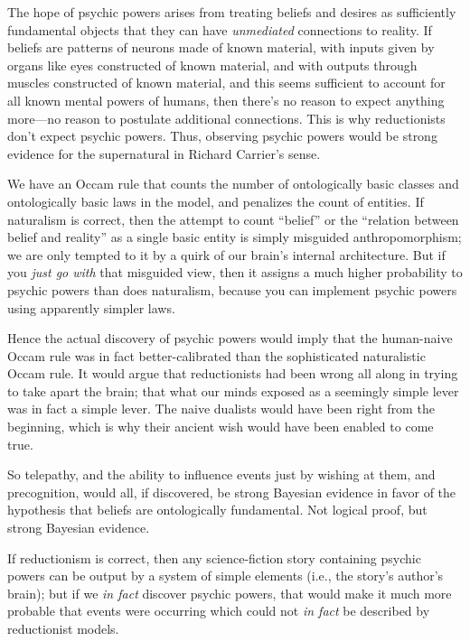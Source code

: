 {
 The hope of psychic powers arises from treating beliefs and
desires as sufficiently fundamental objects that they can have
\textit{unmediated} connections to reality. If beliefs are patterns of
neurons made of known material, with inputs given by organs like eyes
constructed of known material, and with outputs through muscles
constructed of known material, and this seems sufficient to account for
all known mental powers of humans, then there's no
reason to expect anything more---no reason to postulate additional
connections. This is why reductionists don't expect
psychic powers. Thus, observing psychic powers would be strong evidence
for the supernatural in Richard Carrier's sense.}

{
 We have an Occam rule that counts the number of ontologically
basic classes and ontologically basic laws in the model, and penalizes
the count of entities. If naturalism is correct, then the attempt to
count ``belief'' or the
``relation between belief and
reality'' as a single basic entity is simply
misguided anthropomorphism; we are only tempted to it by a quirk of our
brain's internal architecture. But if you \textit{just
go with} that misguided view, then it assigns a much higher probability
to psychic powers than does naturalism, because you can implement
psychic powers using apparently simpler laws.}

{
 Hence the actual discovery of psychic powers would imply that the
human-naive Occam rule was in fact better-calibrated than the
sophisticated naturalistic Occam rule. It would argue that
reductionists had been wrong all along in trying to take apart the
brain; that what our minds exposed as a seemingly simple lever was in
fact a simple lever. The naive dualists would have been right from the
beginning, which is why their ancient wish would have been enabled to
come true.}

{
 So telepathy, and the ability to influence events just by wishing
at them, and precognition, would all, if discovered, be strong Bayesian
evidence in favor of the hypothesis that beliefs are ontologically
fundamental. Not logical proof, but strong Bayesian evidence.}

{
 If reductionism is correct, then any science-fiction story
containing psychic powers can be output by a system of simple elements
(i.e., the story's author's brain); but
if we \textit{in fact} discover psychic powers, that would make it much
more probable that events were occurring which could not \textit{in
fact} be described by reductionist models.}

